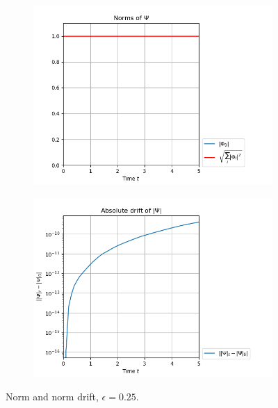 \documentclass[11pt, a4paper, oneside]{article}
\begin{document}
\begin{figure}[h]
  \begin{subfigure}[b]{0.45 \textwidth}
    \includegraphics[width = \textwidth]{graphics/torsional/norms_block0.PNG}
  \end{subfigure}
  \hfill
  \begin{subfigure}[b]{0.45 \textwidth}
    \includegraphics[width = \textwidth]{graphics/torsional/norms_drift_block0_log.PNG}
  \end{subfigure}
  \caption{Norm and norm drift, $\epsilon = 0.25$.}
  \label{fig:cos_norm}
\end{figure}
\end{document}
